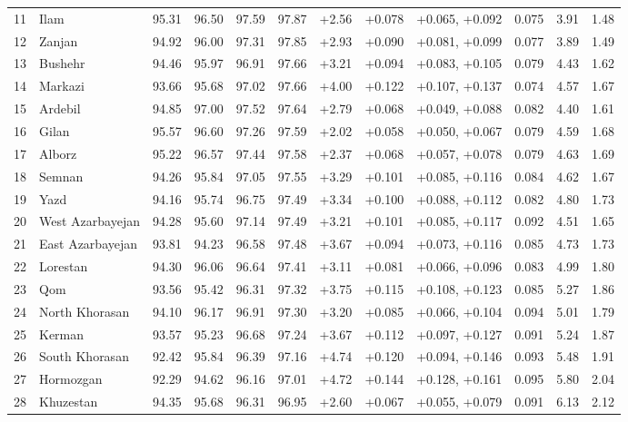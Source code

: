 \documentclass[12pt]{article}
\begin{document}
{\begin{longtable}{clcccccccccc}
11 & Ilam & 95.31 & 96.50 & 97.59 & 97.87 & +2.56 & +0.078 & +0.065, +0.092 & 0.075 & 3.91 & 1.48 \\
12 & Zanjan & 94.92 & 96.00 & 97.31 & 97.85 & +2.93 & +0.090 & +0.081, +0.099 & 0.077 & 3.89 & 1.49 \\
13 & Bushehr & 94.46 & 95.97 & 96.91 & 97.66 & +3.21 & +0.094 & +0.083, +0.105 & 0.079 & 4.43 & 1.62 \\
14 & Markazi & 93.66 & 95.68 & 97.02 & 97.66 & +4.00 & +0.122 & +0.107, +0.137 & 0.074 & 4.57 & 1.67 \\
15 & Ardebil & 94.85 & 97.00 & 97.52 & 97.64 & +2.79 & +0.068 & +0.049, +0.088 & 0.082 & 4.40 & 1.61 \\
16 & Gilan & 95.57 & 96.60 & 97.26 & 97.59 & +2.02 & +0.058 & +0.050, +0.067 & 0.079 & 4.59 & 1.68 \\
17 & Alborz & 95.22 & 96.57 & 97.44 & 97.58 & +2.37 & +0.068 & +0.057, +0.078 & 0.079 & 4.63 & 1.69 \\
18 & Semnan & 94.26 & 95.84 & 97.05 & 97.55 & +3.29 & +0.101 & +0.085, +0.116 & 0.084 & 4.62 & 1.67 \\
19 & Yazd & 94.16 & 95.74 & 96.75 & 97.49 & +3.34 & +0.100 & +0.088, +0.112 & 0.082 & 4.80 & 1.73 \\
20 & West Azarbayejan & 94.28 & 95.60 & 97.14 & 97.49 & +3.21 & +0.101 & +0.085, +0.117 & 0.092 & 4.51 & 1.65 \\
21 & East Azarbayejan & 93.81 & 94.23 & 96.58 & 97.48 & +3.67 & +0.094 & +0.073, +0.116 & 0.085 & 4.73 & 1.73 \\
22 & Lorestan & 94.30 & 96.06 & 96.64 & 97.41 & +3.11 & +0.081 & +0.066, +0.096 & 0.083 & 4.99 & 1.80 \\
23 & Qom & 93.56 & 95.42 & 96.31 & 97.32 & +3.75 & +0.115 & +0.108, +0.123 & 0.085 & 5.27 & 1.86 \\
24 & North Khorasan & 94.10 & 96.17 & 96.91 & 97.30 & +3.20 & +0.085 & +0.066, +0.104 & 0.094 & 5.01 & 1.79 \\
25 & Kerman & 93.57 & 95.23 & 96.68 & 97.24 & +3.67 & +0.112 & +0.097, +0.127 & 0.091 & 5.24 & 1.87 \\
26 & South Khorasan & 92.42 & 95.84 & 96.39 & 97.16 & +4.74 & +0.120 & +0.094, +0.146 & 0.093 & 5.48 & 1.91 \\
27 & Hormozgan & 92.29 & 94.62 & 96.16 & 97.01 & +4.72 & +0.144 & +0.128, +0.161 & 0.095 & 5.80 & 2.04 \\
28 & Khuzestan & 94.35 & 95.68 & 96.31 & 96.95 & +2.60 & +0.067 & +0.055, +0.079 & 0.091 & 6.13 & 2.12 \\

\end{longtable}}
\end{document}
